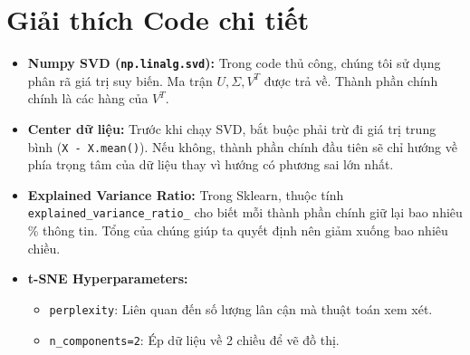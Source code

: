 \documentclass{article}
\begin{document}
\section{Giải thích Code chi tiết}
\begin{itemize}
    \item \textbf{Numpy SVD (\texttt{np.linalg.svd}):} Trong code thủ công, chúng tôi sử dụng phân rã giá trị suy biến. Ma trận $U, \Sigma, V^T$ được trả về. Thành phần chính chính là các hàng của $V^T$.
    \item \textbf{Center dữ liệu:} Trước khi chạy SVD, bắt buộc phải trừ đi giá trị trung bình (\texttt{X - X.mean()}). Nếu không, thành phần chính đầu tiên sẽ chỉ hướng về phía trọng tâm của dữ liệu thay vì hướng có phương sai lớn nhất.
    \item \textbf{Explained Variance Ratio:} Trong Sklearn, thuộc tính \texttt{explained\_variance\_ratio\_} cho biết mỗi thành phần chính giữ lại bao nhiêu \% thông tin. Tổng của chúng giúp ta quyết định nên giảm xuống bao nhiêu chiều.
    \item \textbf{t-SNE Hyperparameters:} 
    \begin{itemize}
        \item \texttt{perplexity}: Liên quan đến số lượng lân cận mà thuật toán xem xét.
        \item \texttt{n\_components=2}: Ép dữ liệu về 2 chiều để vẽ đồ thị.
    \end{itemize}
\end{itemize}
\end{document}
